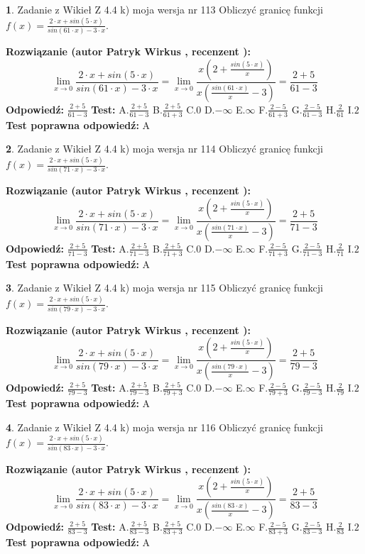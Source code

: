 \documentclass[12pt, a4paper]{article}
\theoremstyle{definition} %
\newtheorem{zad}{}
\newcommand{\zadStart}[1]{\begin{zad}#1\newline}
\newcommand{\zadStop}{\end{zad}}
\newcommand{\rozwStart}[2]{\noindent \textbf{Rozwiązanie (autor #1 , recenzent #2): }\newline}
\newcommand{\rozwStop}{\newline}
\newcommand{\odpStart}{\noindent \textbf{Odpowiedź:}\newline}
\newcommand{\odpStop}{\newline}
\newcommand{\testStart}{\noindent \textbf{Test:}\newline}
\newcommand{\testStop}{\newline}
\newcommand{\kluczStart}{\noindent \textbf{Test poprawna odpowiedź:}\newline}
\newcommand{\kluczStop}{\newline}
\begin{document}
\zadStart{Zadanie z Wikieł Z 4.4 k) moja wersja nr 113}
Obliczyć granicę funkcji $f(x)=\frac{2\cdot x +sin(5\cdot x)}{sin(61\cdot x) -3\cdot x}$.
\zadStop
\rozwStart{Patryk Wirkus}{}
$$\lim\limits_{x\to 0}\frac{2\cdot x +sin(5\cdot x)}{sin(61\cdot x) -3\cdot x}
=\lim\limits_{x\to 0}\frac{x(2+\frac{sin(5\cdot x)}{x})}{x(\frac{sin(61\cdot x)}{x}-3)}
=\frac{2+5}{61-3}$$
\rozwStop
\odpStart
$\frac{2+5}{61-3}$
\odpStop
\testStart
A.$\frac{2+5}{61-3}$
B.$\frac{2+5}{61+3}$
C.$0$
D.$-\infty$
E.$\infty$
F.$\frac{2-5}{61+3}$
G.$\frac{2-5}{61-3}$
H.$\frac{2}{61}$
I.$2$
\testStop
\kluczStart
A
\kluczStop



\zadStart{Zadanie z Wikieł Z 4.4 k) moja wersja nr 114}
Obliczyć granicę funkcji $f(x)=\frac{2\cdot x +sin(5\cdot x)}{sin(71\cdot x) -3\cdot x}$.
\zadStop
\rozwStart{Patryk Wirkus}{}
$$\lim\limits_{x\to 0}\frac{2\cdot x +sin(5\cdot x)}{sin(71\cdot x) -3\cdot x}
=\lim\limits_{x\to 0}\frac{x(2+\frac{sin(5\cdot x)}{x})}{x(\frac{sin(71\cdot x)}{x}-3)}
=\frac{2+5}{71-3}$$
\rozwStop
\odpStart
$\frac{2+5}{71-3}$
\odpStop
\testStart
A.$\frac{2+5}{71-3}$
B.$\frac{2+5}{71+3}$
C.$0$
D.$-\infty$
E.$\infty$
F.$\frac{2-5}{71+3}$
G.$\frac{2-5}{71-3}$
H.$\frac{2}{71}$
I.$2$
\testStop
\kluczStart
A
\kluczStop



\zadStart{Zadanie z Wikieł Z 4.4 k) moja wersja nr 115}
Obliczyć granicę funkcji $f(x)=\frac{2\cdot x +sin(5\cdot x)}{sin(79\cdot x) -3\cdot x}$.
\zadStop
\rozwStart{Patryk Wirkus}{}
$$\lim\limits_{x\to 0}\frac{2\cdot x +sin(5\cdot x)}{sin(79\cdot x) -3\cdot x}
=\lim\limits_{x\to 0}\frac{x(2+\frac{sin(5\cdot x)}{x})}{x(\frac{sin(79\cdot x)}{x}-3)}
=\frac{2+5}{79-3}$$
\rozwStop
\odpStart
$\frac{2+5}{79-3}$
\odpStop
\testStart
A.$\frac{2+5}{79-3}$
B.$\frac{2+5}{79+3}$
C.$0$
D.$-\infty$
E.$\infty$
F.$\frac{2-5}{79+3}$
G.$\frac{2-5}{79-3}$
H.$\frac{2}{79}$
I.$2$
\testStop
\kluczStart
A
\kluczStop



\zadStart{Zadanie z Wikieł Z 4.4 k) moja wersja nr 116}
Obliczyć granicę funkcji $f(x)=\frac{2\cdot x +sin(5\cdot x)}{sin(83\cdot x) -3\cdot x}$.
\zadStop
\rozwStart{Patryk Wirkus}{}
$$\lim\limits_{x\to 0}\frac{2\cdot x +sin(5\cdot x)}{sin(83\cdot x) -3\cdot x}
=\lim\limits_{x\to 0}\frac{x(2+\frac{sin(5\cdot x)}{x})}{x(\frac{sin(83\cdot x)}{x}-3)}
=\frac{2+5}{83-3}$$
\rozwStop
\odpStart
$\frac{2+5}{83-3}$
\odpStop
\testStart
A.$\frac{2+5}{83-3}$
B.$\frac{2+5}{83+3}$
C.$0$
D.$-\infty$
E.$\infty$
F.$\frac{2-5}{83+3}$
G.$\frac{2-5}{83-3}$
H.$\frac{2}{83}$
I.$2$
\testStop
\kluczStart
A
\kluczStop
\end{document}
